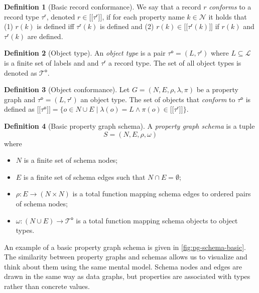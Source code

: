 \documentclass{report}
\theoremstyle{definition}
\newtheorem{definition}{Definition}
\newcommand{\rtype}{\tau^\mathsf{r}}
\newcommand{\otype}{\tau^\mathsf{o}}
\newcommand{\otypes}{\mathcal{T}^\mathsf{o}}
\newcommand{\lsem}{\ensuremath{[\![}}
\newcommand{\rsem}{\ensuremath{]\!]}}
\newcommand{\sem}[1]{\ensuremath{\lsem #1 \rsem}}
\begin{document}
\begin{definition}[Basic record conformance]
  \label{def:record-conformance-basic}
  We say that a record $r$ \emph{conforms} to a record type $\rtype$, denoted $r \in \sem{\rtype}$, if for each property name $k \in \mathcal{N}$ it holds that (1) $r(k)$ is defined iff $\rtype(k)$ is defined and (2) $r(k) \in \sem{\rtype(k)}$ if $r(k)$ and $\rtype(k)$ are defined.
\end{definition}

\begin{definition}[Object type]
  \label{def:object-type}
  An \emph{object type} is a pair $\otype = (L, \rtype)$ where $L \subseteq \mathcal{L}$ is a finite set of labels and and $\rtype$ a record type.
  The set of all object types is denoted as $\otypes$.
\end{definition}

\begin{definition}[Object conformance]
  \label{def:object-conformance}
  Let $G = (N, E, \rho, \lambda, \pi)$ be a property graph and $\otype = (L, \rtype)$ an object type. The set of objects that \emph{conform} to $\otype$ is defined as $\sem{\otype} = \{o \in N \cup E \mid \lambda(o) = L \wedge \pi(o) \in \sem{\rtype}\}$.
\end{definition}

\begin{definition}[Basic property graph schema]
  \label{def:pg-schema-basic}
  A \emph{property graph schema} is a tuple $$S = (N, E, \rho, \omega)$$ where
  \begin{itemize}
    \item $N$ is a finite set of schema nodes;
    \item $E$ is a finite set of schema edges such that $N \cap E = \emptyset$;
    \item $\rho : E \to (N \times N)$ is a total function mapping schema edges to ordered pairs of schema nodes;
    \item $\omega : (N \cup E) \to \otypes$ is a total function mapping schema objects to object types.
  \end{itemize}
\end{definition}

An example of a basic property graph schema is given in \autoref{fig:pg-schema-basic}. The similarity between property graphs and schemas allows us to visualize and think about them using the same mental model. Schema nodes and edges are drawn in the same way as data graphs, but properties are associated with types rather than concrete values.
\end{document}

